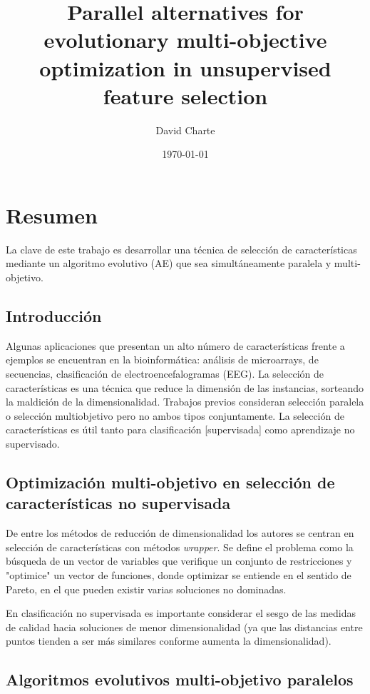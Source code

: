 \documentclass{article}
\author{David Charte}
\date{\today}
\title{Parallel alternatives for evolutionary multi-objective optimization in unsupervised feature selection}
\begin{document}
\maketitle
\tableofcontents



\section{Resumen}
\label{sec-1}

La clave de este trabajo es desarrollar una técnica de selección de características mediante un algoritmo evolutivo (AE) que sea simultáneamente paralela y multi-objetivo.

\subsection{Introducción}
\label{sec-1-1}

Algunas aplicaciones que presentan un alto número de características frente a ejemplos se encuentran en la bioinformática: análisis de microarrays, de secuencias, clasificación de electroencefalogramas (EEG). La selección de características es una técnica que reduce la dimensión de las instancias, sorteando la maldición de la dimensionalidad. Trabajos previos consideran selección paralela o selección multiobjetivo pero no ambos tipos conjuntamente. La selección de características es útil tanto para clasificación [supervisada] como aprendizaje no supervisado.

\subsection{Optimización multi-objetivo en selección de características no supervisada}
\label{sec-1-2}

De entre los métodos de reducción de dimensionalidad los autores se centran en selección de características con métodos \emph{wrapper}. Se define el problema como la búsqueda de un vector de variables que verifique un conjunto de restricciones y "optimice" un vector de funciones, donde optimizar se entiende en el sentido de Pareto, en el que pueden existir varias soluciones no dominadas.

En clasificación no supervisada es importante considerar el sesgo de las medidas de calidad hacia soluciones de menor dimensionalidad (ya que las distancias entre puntos tienden a ser más similares conforme aumenta la dimensionalidad).

\subsection{Algoritmos evolutivos multi-objetivo paralelos}
\label{sec-1-3}
\end{document}
